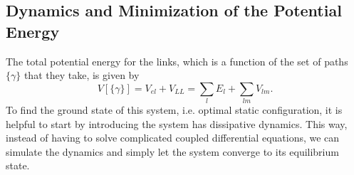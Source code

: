 \documentclass[nofootinbib,preprint,floatfix,titlepage,superscriptaddress]{revtex4} %
\begin{document}
\subsection{Dynamics and Minimization of the Potential Energy\label{ap:eom}}
The total potential energy for the links, which is a function of the set of paths $\{\gamma \} $ that they take, is given by
\begin{equation}
V[\{\gamma\}] = V_{el} + V_{LL} = \sum_l E_l + \sum_{lm} V_{lm}. \label{eq:V}
\end{equation}
To find the ground state of this system, i.e. optimal static configuration, it is helpful to start by introducing the system has dissipative dynamics. This way, instead of having to solve complicated coupled differential equations, we can simulate the dynamics and simply let the system converge to its equilibrium state. 
\end{document}
